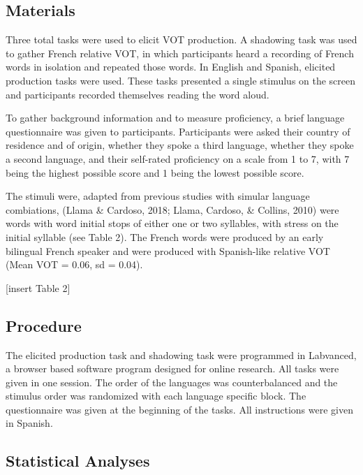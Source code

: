 \documentclass[
  english,
  man]{apa6}
\begin{document}
\hypertarget{materials}{%
\subsection{Materials}\label{materials}}

Three total tasks were used to elicit VOT production.
A shadowing task was used to gather French relative VOT, in which participants heard a recording of French words in isolation and repeated those words.
In English and Spanish, elicited production tasks were used.
These tasks presented a single stimulus on the screen and participants recorded themselves reading the word aloud.

To gather background information and to measure proficiency, a brief language questionnaire was given to participants.
Participants were asked their country of residence and of origin, whether they spoke a third language, whether they spoke a second language, and their self-rated proficiency on a scale from 1 to 7, with 7 being the highest possible score and 1 being the lowest possible score.

The stimuli were, adapted from previous studies with simular language combiations, (Llama \& Cardoso, 2018; Llama, Cardoso, \& Collins, 2010) were words with word initial stops of either one or two syllables, with stress on the initial syllable (see Table 2).
The French words were produced by an early bilingual French speaker and were produced with Spanish-like relative VOT (Mean VOT = 0.06, sd = 0.04).

{[}insert Table 2{]}

\hypertarget{procedure}{%
\subsection{Procedure}\label{procedure}}

The elicited production task and shadowing task were programmed in Labvanced, a browser based software program designed for online research.
All tasks were given in one session.
The order of the languages was counterbalanced and the stimulus order was randomized with each language specific block.
The questionnaire was given at the beginning of the tasks.
All instructions were given in Spanish.

\hypertarget{statistical-analyses}{%
\subsection{Statistical Analyses}\label{statistical-analyses}}
\end{document}
